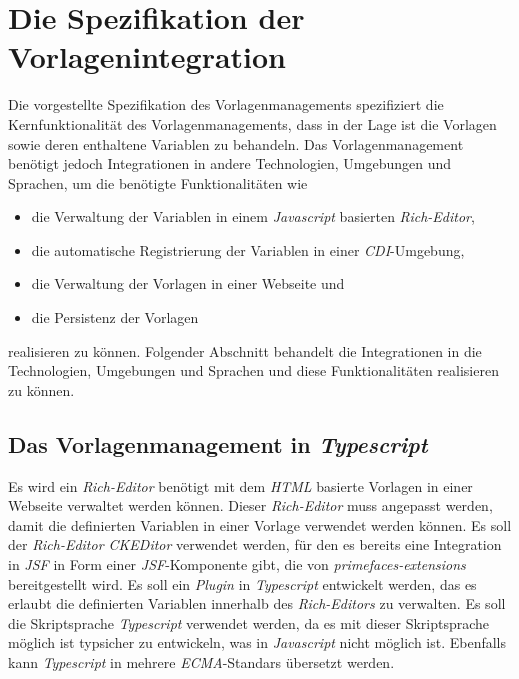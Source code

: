 \section{Die Spezifikation der Vorlagenintegration}
Die vorgestellte Spezifikation des Vorlagenmanagements spezifiziert die Kernfunktionalität des Vorlagenmanagements, dass in der Lage ist die Vorlagen sowie deren enthaltene Variablen zu behandeln. Das Vorlagenmanagement benötigt jedoch Integrationen in andere Technologien, Umgebungen und Sprachen, um die benötigte Funktionalitäten wie
\begin{itemize}
	\item die Verwaltung der Variablen in einem \emph{Javascript} basierten \emph{Rich-Editor},
	\item die automatische Registrierung der Variablen in einer \emph{CDI}-Umgebung,
	\item die Verwaltung der Vorlagen in einer Webseite und
	\item die Persistenz der Vorlagen
\end{itemize}
realisieren zu können. Folgender Abschnitt behandelt die Integrationen in die Technologien, Umgebungen und Sprachen und diese Funktionalitäten realisieren zu können.
 
\subsection{Das Vorlagenmanagement in \emph{Typescript}}
\label{sec:sub-typescript-javascript}
Es wird ein \emph{Rich-Editor} benötigt mit dem \emph{HTML} basierte Vorlagen in einer Webseite verwaltet werden können. Dieser \emph{Rich-Editor} muss angepasst werden, damit die definierten Variablen in einer Vorlage verwendet werden können. Es soll der \emph{Rich-Editor CKEDitor} verwendet werden, für den es bereits eine Integration in \emph{JSF} in Form einer \emph{JSF}-Komponente gibt, die von \emph{primefaces-extensions} bereitgestellt wird. Es soll ein \emph{Plugin} in \emph{Typescript} entwickelt werden, das es erlaubt die definierten Variablen innerhalb des \emph{Rich-Editors} zu verwalten. Es soll die Skriptsprache \emph{Typescript} verwendet werden, da es mit dieser Skriptsprache möglich ist typsicher zu entwickeln, was in \emph{Javascript} nicht möglich ist. Ebenfalls kann \emph{Typescript} in mehrere \emph{ECMA}-Standars übersetzt werden.

